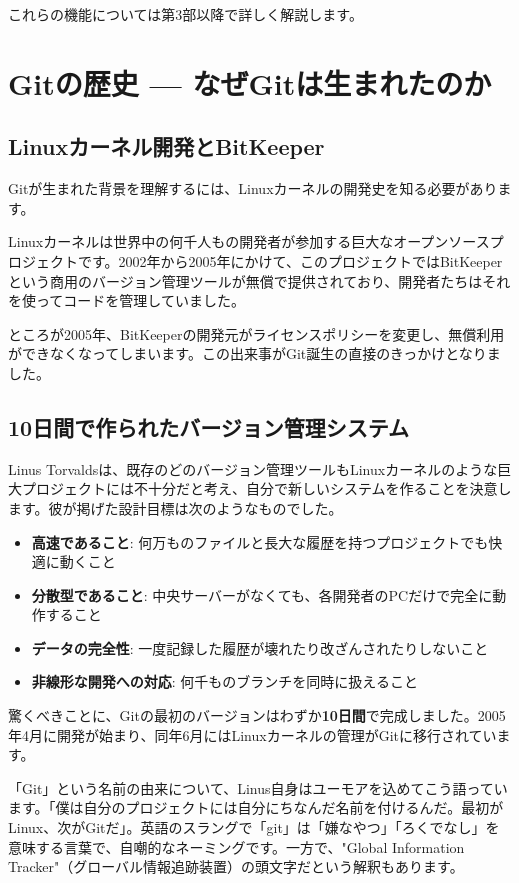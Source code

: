これらの機能については第3部以降で詳しく解説します。

\section{Gitの歴史 — なぜGitは生まれたのか}

\subsection{Linuxカーネル開発とBitKeeper}

Gitが生まれた背景を理解するには、Linuxカーネルの開発史を知る必要があります。

Linuxカーネルは世界中の何千人もの開発者が参加する巨大なオープンソースプロジェクトです。2002年から2005年にかけて、このプロジェクトではBitKeeperという商用のバージョン管理ツールが無償で提供されており、開発者たちはそれを使ってコードを管理していました。

ところが2005年、BitKeeperの開発元がライセンスポリシーを変更し、無償利用ができなくなってしまいます。この出来事がGit誕生の直接のきっかけとなりました。

\subsection{10日間で作られたバージョン管理システム}

Linus Torvaldsは、既存のどのバージョン管理ツールもLinuxカーネルのような巨大プロジェクトには不十分だと考え、自分で新しいシステムを作ることを決意します。彼が掲げた設計目標は次のようなものでした。

\begin{itemize}
  \item \textbf{高速であること}: 何万ものファイルと長大な履歴を持つプロジェクトでも快適に動くこと
  \item \textbf{分散型であること}: 中央サーバーがなくても、各開発者のPCだけで完全に動作すること
  \item \textbf{データの完全性}: 一度記録した履歴が壊れたり改ざんされたりしないこと
  \item \textbf{非線形な開発への対応}: 何千ものブランチを同時に扱えること
\end{itemize}

驚くべきことに、Gitの最初のバージョンはわずか\textbf{10日間}で完成しました。2005年4月に開発が始まり、同年6月にはLinuxカーネルの管理がGitに移行されています。

「Git」という名前の由来について、Linus自身はユーモアを込めてこう語っています。「僕は自分のプロジェクトには自分にちなんだ名前を付けるんだ。最初がLinux、次がGitだ」。英語のスラングで「git」は「嫌なやつ」「ろくでなし」を意味する言葉で、自嘲的なネーミングです。一方で、"Global Information Tracker"（グローバル情報追跡装置）の頭文字だという解釈もあります。

